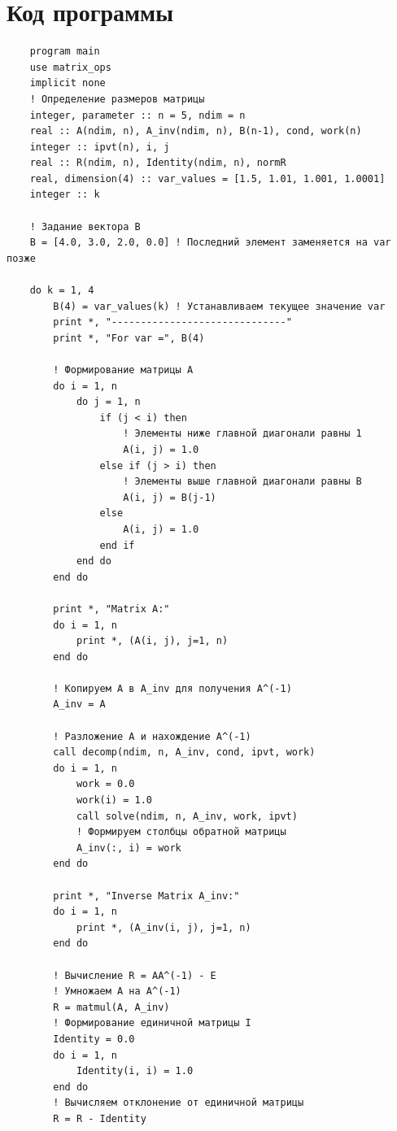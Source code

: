 \documentclass[a4paper,14pt]{article}
\begin{document}
\section{Код программы}

\begin{lstlisting}
    program main
    use matrix_ops
    implicit none
    ! Определение размеров матрицы
    integer, parameter :: n = 5, ndim = n
    real :: A(ndim, n), A_inv(ndim, n), B(n-1), cond, work(n)
    integer :: ipvt(n), i, j
    real :: R(ndim, n), Identity(ndim, n), normR
    real, dimension(4) :: var_values = [1.5, 1.01, 1.001, 1.0001]
    integer :: k
    
    ! Задание вектора B
    B = [4.0, 3.0, 2.0, 0.0] ! Последний элемент заменяется на var позже
    
    do k = 1, 4
        B(4) = var_values(k) ! Устанавливаем текущее значение var
        print *, "------------------------------"
        print *, "For var =", B(4)
        
        ! Формирование матрицы A
        do i = 1, n
            do j = 1, n
                if (j < i) then
                    ! Элементы ниже главной диагонали равны 1
                    A(i, j) = 1.0
                else if (j > i) then
                    ! Элементы выше главной диагонали равны B
                    A(i, j) = B(j-1)
                else
                    A(i, j) = 1.0
                end if
            end do
        end do
        
        print *, "Matrix A:"
        do i = 1, n
            print *, (A(i, j), j=1, n)
        end do
        
        ! Копируем A в A_inv для получения A^(-1)
        A_inv = A
        
        ! Разложение A и нахождение A^(-1)
        call decomp(ndim, n, A_inv, cond, ipvt, work)
        do i = 1, n
            work = 0.0
            work(i) = 1.0
            call solve(ndim, n, A_inv, work, ipvt)
            ! Формируем столбцы обратной матрицы
            A_inv(:, i) = work
        end do
        
        print *, "Inverse Matrix A_inv:"
        do i = 1, n
            print *, (A_inv(i, j), j=1, n)
        end do
        
        ! Вычисление R = AA^(-1) - E
        ! Умножаем A на A^(-1)
        R = matmul(A, A_inv)
        ! Формирование единичной матрицы I
        Identity = 0.0
        do i = 1, n
            Identity(i, i) = 1.0
        end do
        ! Вычисляем отклонение от единичной матрицы
        R = R - Identity
        

\end{lstlisting}
\end{document}
